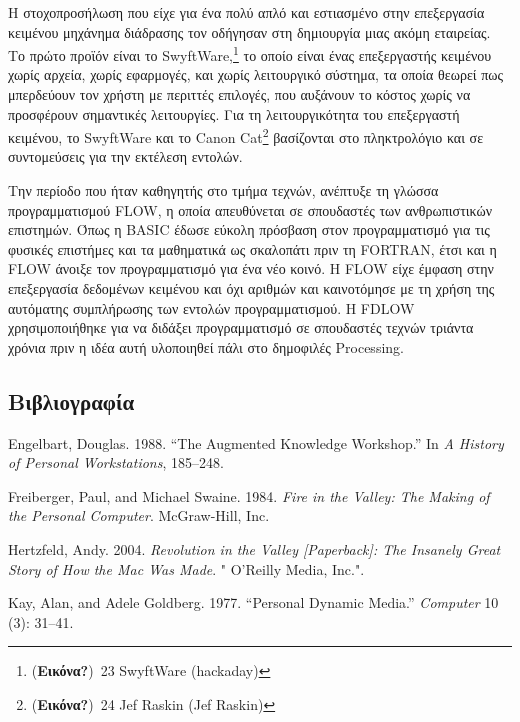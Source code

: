 \documentclass[
]{article}
\newlength{\cslhangindent}
\newlength{\cslentryspacingunit} %
\newenvironment{CSLReferences}[2] %
 {%
  \setlength{\parindent}{0pt}
  \ifodd #1
  \let\oldpar\par
  \def\par{\hangindent=\cslhangindent\oldpar}
  \fi
  \setlength{\parskip}{#2\cslentryspacingunit}
 }%
 {}
\begin{document}
Η στοχοπροσήλωση που είχε για ένα πολύ απλό και εστιασμένο στην
επεξεργασία κειμένου μηχάνημα διάδρασης τον οδήγησαν στη δημιουργία μιας
ακόμη εταιρείας. Το πρώτο προϊόν είναι το SwyftWare,\footnote{(\textbf{Εικόνα?})~23
  SwyftWare (hackaday)} το οποίο είναι ένας επεξεργαστής κειμένου χωρίς
αρχεία, χωρίς εφαρμογές, και χωρίς λειτουργικό σύστημα, τα οποία θεωρεί
πως μπερδεύουν τον χρήστη με περιττές επιλογές, που αυξάνουν το κόστος
χωρίς να προσφέρουν σημαντικές λειτουργίες. Για τη λειτουργικότητα του
επεξεργαστή κειμένου, το SwyftWare και το Canon Cat\footnote{(\textbf{Εικόνα?})~24
  Jef Raskin (Jef Raskin)} βασίζονται στο πληκτρολόγιο και σε
συντομεύσεις για την εκτέλεση εντολών.

Την περίοδο που ήταν καθηγητής στο τμήμα τεχνών, ανέπτυξε τη γλώσσα
προγραμματισμού FLOW, η οποία απευθύνεται σε σπουδαστές των
ανθρωπιστικών επιστημών. Όπως η BASIC έδωσε εύκολη πρόσβαση στον
προγραμματισμό για τις φυσικές επιστήμες και τα μαθηματικά ως σκαλοπάτι
πριν τη FORTRAN, έτσι και η FLOW άνοιξε τον προγραμματισμό για ένα νέο
κοινό. Η FLOW είχε έμφαση στην επεξεργασία δεδομένων κειμένου και όχι
αριθμών και καινοτόμησε με τη χρήση της αυτόματης συμπλήρωσης των
εντολών προγραμματισμού. Η FDLOW χρησιμοποιήθηκε για να διδάξει
προγραμματισμό σε σπουδαστές τεχνών τριάντα χρόνια πριν η ιδέα αυτή
υλοποιηθεί πάλι στο δημοφιλές Processing.

\hypertarget{ux3b2ux3b9ux3b2ux3bbux3b9ux3bfux3b3ux3c1ux3b1ux3c6ux3afux3b1}{%
\subsection*{Βιβλιογραφία}\label{ux3b2ux3b9ux3b2ux3bbux3b9ux3bfux3b3ux3c1ux3b1ux3c6ux3afux3b1}}

\hypertarget{refs}{}
\begin{CSLReferences}{0}{0}
\end{CSLReferences}

Engelbart, Douglas. 1988. {``The Augmented Knowledge Workshop.''} In
\emph{A History of Personal Workstations}, 185--248.

Freiberger, Paul, and Michael Swaine. 1984. \emph{Fire in the Valley:
The Making of the Personal Computer}. McGraw-Hill, Inc.

Hertzfeld, Andy. 2004. \emph{Revolution in the Valley
{{[}}Paperback{{]}}: The Insanely Great Story of How the Mac Was Made}.
" O'Reilly Media, Inc.".

Kay, Alan, and Adele Goldberg. 1977. {``Personal Dynamic Media.''}
\emph{Computer} 10 (3): 31--41.
\end{document}
